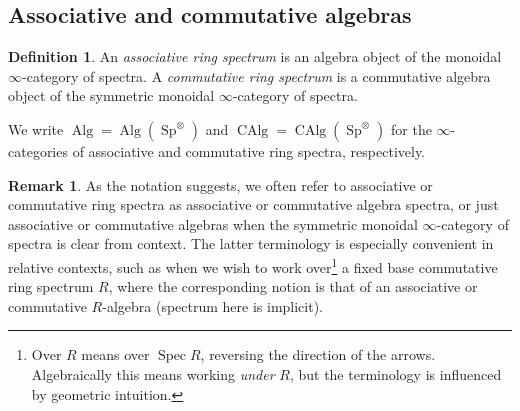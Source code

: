 \documentclass[12pt]{article}
\theoremstyle{definition}
\newtheorem{definition}{Definition}[subsection]
\newtheorem{remark}{Remark}[subsection]
\renewcommand{\i}{\infty}
\DeclareMathOperator{\Alg}{Alg}
\DeclareMathOperator{\CAlg}{CAlg}
\DeclareMathOperator{\Spec}{Spec}
\DeclareMathOperator{\Sp}{Sp}
\begin{document}
\subsection{Associative and commutative algebras}

\begin{definition}
An {\em associative ring spectrum} is an algebra object of the monoidal $\i$-category of spectra.
A {\em commutative ring spectrum} is a commutative algebra object of the symmetric monoidal $\i$-category of spectra.
\end{definition}


We write $\Alg=\Alg(\Sp^\otimes)$ and $\CAlg=\CAlg(\Sp^\otimes)$ for the $\infty$-categories of associative and commutative ring spectra, respectively.

\begin{remark}
As the notation suggests, we often refer to associative or commutative ring spectra as associative or commutative algebra spectra, or just associative or commutative algebras when the symmetric monoidal $\i$-category of spectra is clear from context.
The latter terminology is especially convenient in relative contexts, such as when we wish to work over\footnote{Over $R$ means over $\Spec R$, reversing the direction of the arrows. Algebraically this means working {\em under} $R$, but the terminology is influenced by geometric intuition.} a fixed base commutative ring spectrum $R$, where the corresponding notion is that of an associative or commutative $R$-algebra (spectrum here is implicit).
\end{remark}
\end{document}

